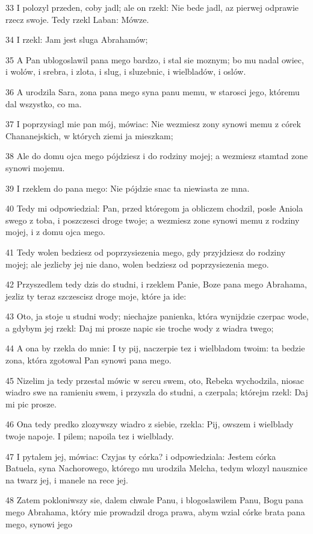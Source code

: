 \par 33 I polozyl przeden, coby jadl; ale on rzekl: Nie bede jadl, az pierwej odprawie rzecz swoje. Tedy rzekl Laban: Mówze.
\par 34 I rzekl: Jam jest sluga Abrahamów;
\par 35 A Pan ublogoslawil pana mego bardzo, i stal sie moznym; bo mu nadal owiec, i wolów, i srebra, i zlota, i slug, i sluzebnic, i wielbladów, i oslów.
\par 36 A urodzila Sara, zona pana mego syna panu memu, w starosci jego, któremu dal wszystko, co ma.
\par 37 I poprzysiagl mie pan mój, mówiac: Nie wezmiesz zony synowi memu z córek Chananejskich, w których ziemi ja mieszkam;
\par 38 Ale do domu ojca mego pójdziesz i do rodziny mojej; a wezmiesz stamtad zone synowi mojemu.
\par 39 I rzeklem do pana mego: Nie pójdzie snac ta niewiasta ze mna.
\par 40 Tedy mi odpowiedzial: Pan, przed któregom ja obliczem chodzil, posle Aniola swego z toba, i poszczesci droge twoje; a wezmiesz zone synowi memu z rodziny mojej, i z domu ojca mego.
\par 41 Tedy wolen bedziesz od poprzysiezenia mego, gdy przyjdziesz do rodziny mojej; ale jezlicby jej nie dano, wolen bedziesz od poprzysiezenia mego.
\par 42 Przyszedlem tedy dzis do studni, i rzeklem Panie, Boze pana mego Abrahama, jezliz ty teraz szczescisz droge moje, które ja ide:
\par 43 Oto, ja stoje u studni wody; niechajze panienka, która wynijdzie czerpac wode, a gdybym jej rzekl: Daj mi prosze napic sie troche wody z wiadra twego;
\par 44 A ona by rzekla do mnie: I ty pij, naczerpie tez i wielbladom twoim: ta bedzie zona, która zgotowal Pan synowi pana mego.
\par 45 Nizelim ja tedy przestal mówic w sercu swem, oto, Rebeka wychodzila, niosac wiadro swe na ramieniu swem, i przyszla do studni, a czerpala; którejm rzekl: Daj mi pic prosze.
\par 46 Ona tedy predko zlozywszy wiadro z siebie, rzekla: Pij, owszem i wielblady twoje napoje. I pilem; napoila tez i wielblady.
\par 47 I pytalem jej, mówiac: Czyjas ty córka? i odpowiedziala: Jestem córka Batuela, syna Nachorowego, którego mu urodzila Melcha, tedym wlozyl nausznice na twarz jej, i manele na rece jej.
\par 48 Zatem pokloniwszy sie, dalem chwale Panu, i blogoslawilem Panu, Bogu pana mego Abrahama, który mie prowadzil droga prawa, abym wzial córke brata pana mego, synowi jego
